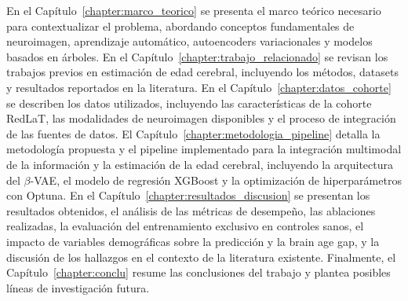 En el Capítulo~\ref{chapter:marco_teorico} se presenta el marco teórico necesario para contextualizar el problema, abordando conceptos fundamentales de neuroimagen, aprendizaje automático, autoencoders variacionales y modelos basados en árboles. En el Capítulo~\ref{chapter:trabajo_relacionado} se revisan los trabajos previos en estimación de edad cerebral, incluyendo los métodos, datasets y resultados reportados en la literatura. En el Capítulo~\ref{chapter:datos_cohorte} se describen los datos utilizados, incluyendo las características de la cohorte RedLaT, las modalidades de neuroimagen disponibles y el proceso de integración de las fuentes de datos. El Capítulo~\ref{chapter:metodologia_pipeline} detalla la metodología propuesta y el pipeline implementado para la integración multimodal de la información y la estimación de la edad cerebral, incluyendo la arquitectura del $\beta$-VAE, el modelo de regresión XGBoost y la optimización de hiperparámetros con Optuna. En el Capítulo~\ref{chapter:resultados_discusion} se presentan los resultados obtenidos, el análisis de las métricas de desempeño, las ablaciones realizadas, la evaluación del entrenamiento exclusivo en controles sanos, el impacto de variables demográficas sobre la predicción y la brain age gap, y la discusión de los hallazgos en el contexto de la literatura existente. Finalmente, el Capítulo~\ref{chapter:conclu} resume las conclusiones del trabajo y plantea posibles líneas de investigación futura.